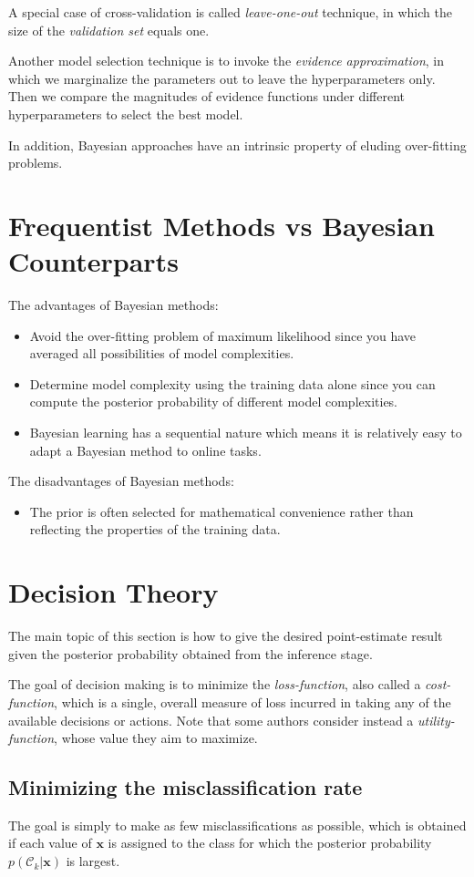 \documentclass[a4paper]{report}
\renewcommand{\bf}{\mathbf}
\renewcommand{\cal}{\mathcal}
\newcommand{\imp}[1]{{\color{blue}\textit{#1}}}
\begin{document}
A special case of cross-validation is called \textit{leave-one-out} technique, in which the size of the \textit{validation set} equals one.

Another model selection technique is to invoke the \imp{evidence approximation}, in which we marginalize the parameters out to leave the hyperparameters only. Then we compare the magnitudes of evidence functions under different hyperparameters to select the best model.


In addition, Bayesian approaches have an intrinsic property of eluding over-fitting problems.\
\section{Frequentist Methods vs Bayesian Counterparts}
The advantages of Bayesian methods:
\begin{itemize}
	\item Avoid the over-fitting problem of maximum likelihood since you have averaged all possibilities of model complexities.
	\item Determine model complexity using the training data alone since you can compute the posterior probability of different model complexities.
	\item Bayesian learning has a sequential nature which means it is relatively easy to adapt a Bayesian method to online tasks.
\end{itemize}

The disadvantages of Bayesian methods:
\begin{itemize}
	\item The prior is often selected for mathematical convenience rather than reflecting the properties of the training data.
\end{itemize}
\section{Decision Theory}
The main topic of this section is how to give the desired point-estimate result given the posterior probability obtained from the inference stage. 

The goal of decision making is to minimize the \imp{loss-function}, also called a \imp{cost-function}, which is a single, overall measure of loss incurred in taking any of the available decisions or actions. Note that some authors consider instead a \imp{utility-function}, whose value they aim to maximize. 
\subsection{Minimizing the misclassification rate}
The goal is simply to make as few misclassifications as possible, which is obtained if each value of $\bf{x}$ is assigned to the class for which the posterior probability $p(\cal{C}_k|\bf{x})$ is largest.
\end{document}
